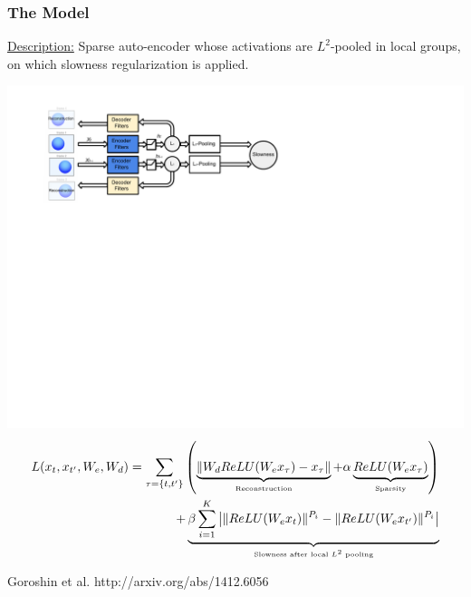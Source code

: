 \documentclass{beamer}
\begin{document}
\begin{frame}
\frametitle{The Model}
\underline{Description:} Sparse auto-encoder whose activations are $L^2$-pooled in local groups, on which slowness regularization is applied.
\begin{center} 
\includegraphics[scale=0.50,trim = 15 350 290 39, clip]{./Figures/Project1/diagram.pdf} \\
{\small
\begin{eqnarray}
\nonumber 
L(x_t,x_{t'},W_e,W_d)= \sum_{\tau = \{t,t'\}} \left(\underbrace{\|W_d ReLU(W_e x_\tau) - x_\tau\|}_{\mbox{\tiny Reconstruction}} +  \alpha \underbrace{ReLU(W_e x_\tau)}_{\mbox{\tiny Sparsity}} \right) \\
\nonumber
 + \underbrace{\beta \sum_{i=1}^K \left| \|ReLU(W_ex_t)\|^{P_i} - \|ReLU(W_ex_{t'})\|^{P_i} \right|}_{\mbox{\tiny Slowness after local $L^2$ pooling}}
\end{eqnarray}}
\end{center} 
\tiny{Goroshin et al. http://arxiv.org/abs/1412.6056}
\end{frame} 
\end{document}
